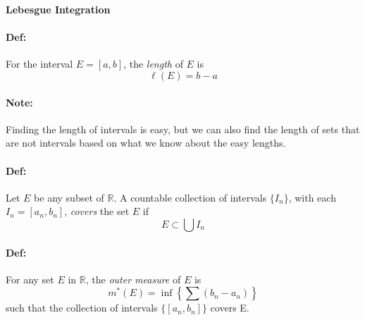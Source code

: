 \documentclass[10pt,a4paper]{article}
\begin{document}
\begin{center}
\textbf{Lebesgue Integration}
\end{center}

\paragraph{Def:} For the interval $E = [a,b]$, the \textit{length} of $E$ is 
$$ \ell(E) = b-a$$

\paragraph{Note:} Finding the length of intervals is easy, but we can also find the length of sets that are not intervals based on what we know about the easy lengths.

\paragraph{Def:} Let $E$ be any subset of $\mathbb{R}$. A countable collection of intervals $\{ I_n \}$, with each $I_n = [a_n, b_n]$, \textit{covers} the set $E$ if
$$ E \subset \bigcup I_n$$

\paragraph{Def:} For any set $E$ in $\mathbb{R}$, the \textit{outer measure} of $E$ is 
$$ m^*(E) = \inf\left \{ \sum (b_n-a_n)\right \}$$
such that the collection of intervals $\{ [a_n, b_n]\}$ covers E.
\end{document}
